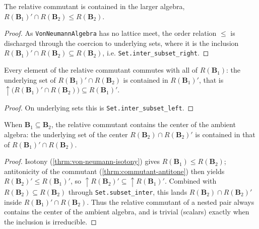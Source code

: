 \begin{theorem}
    \label{thrm:relative-commutant-le-right}
    \leanok
    The relative commutant is contained in the larger algebra, $R(\mathbf{B}_1)' \cap R(\mathbf{B}_2) \le R(\mathbf{B}_2)$.
\end{theorem}
\begin{proof}
    \leanok
    As \texttt{VonNeumannAlgebra} has no lattice meet, the order relation $\le$ is discharged through the coercion to underlying sets, where it is the inclusion $R(\mathbf{B}_1)' \cap R(\mathbf{B}_2) \subseteq R(\mathbf{B}_2)$, i.e. \texttt{Set.inter\_subset\_right}.
\end{proof}

\begin{theorem}
    \label{thrm:relative-commutant-coe-commutant}
    \leanok
    Every element of the relative commutant commutes with all of $R(\mathbf{B}_1)$: the underlying set of $R(\mathbf{B}_1)' \cap R(\mathbf{B}_2)$ is contained in $R(\mathbf{B}_1)'$, that is $\uparrow\!\big(R(\mathbf{B}_1)' \cap R(\mathbf{B}_2)\big) \subseteq R(\mathbf{B}_1)'$.
\end{theorem}
\begin{proof}
    \leanok
    On underlying sets this is \texttt{Set.inter\_subset\_left}.
\end{proof}

\begin{theorem}
    \label{thrm:relative-commutant-center}
    \leanok
    When $\mathbf{B}_1 \subseteq \mathbf{B}_2$, the relative commutant contains the center of the ambient algebra: the underlying set of the center $R(\mathbf{B}_2) \cap R(\mathbf{B}_2)'$ is contained in that of $R(\mathbf{B}_1)' \cap R(\mathbf{B}_2)$.
\end{theorem}
\begin{proof}
    \leanok
    Isotony (\ref{thrm:von-neumann-isotony}) gives $R(\mathbf{B}_1) \le R(\mathbf{B}_2)$; antitonicity of the commutant (\ref{thrm:commutant-antitone}) then yields $R(\mathbf{B}_2)' \le R(\mathbf{B}_1)'$, so $\uparrow R(\mathbf{B}_2)' \subseteq \uparrow R(\mathbf{B}_1)'$. Combined with $R(\mathbf{B}_2) \subseteq R(\mathbf{B}_2)$ through \texttt{Set.subset\_inter}, this lands $R(\mathbf{B}_2) \cap R(\mathbf{B}_2)'$ inside $R(\mathbf{B}_1)' \cap R(\mathbf{B}_2)$. Thus the relative commutant of a nested pair always contains the center of the ambient algebra, and is trivial (scalars) exactly when the inclusion is irreducible.
\end{proof}

